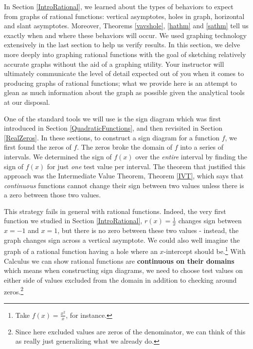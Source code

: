 \documentclass{ximera}
\begin{document}
	\author{Stitz-Zeager}



\setcounter{footnote}{0}

\label{RationalGraphs}

In Section \ref{IntroRational}, we learned about the types of behaviors to expect from graphs of rational functions: vertical asymptotes, holes in graph, horizontal and slant asymptotes.   Moreover,  Theorems \ref{vavshole}, \ref{hathm} and \ref{sathm} tell us exactly when and where these behaviors will occur.  We used graphing technology extensively in the last section to help us verify results. In this section, we delve more deeply into graphing rational functions with the goal of sketching relatively accurate graphs without the aid of a graphing utility.  Your instructor will ultimately communicate the level of detail expected out of you when it comes to producing graphs of rational functions;  what we provide here is an attempt to glean as much information about the graph as possible given the analytical tools at our disposal.  

  \smallskip

One of the standard tools we will use is the sign diagram which was first introduced in Section \ref{QuadraticFunctions}, and then revisited in Section \ref{RealZeros}. In these sections,  to construct a sign diagram for a function $f$, we first found the zeros of $f$.  The zeros broke  the domain of $f$ into a series of intervals.  We determined the sign of $f(x)$ over the \textit{entire} interval by finding the sign of $f(x)$ for just \textit{one} test value per interval.  The theorem that justified this approach was the Intermediate Value Theorem, Theorem \ref{IVT}, which says that \textit{continuous} functions cannot change their sign between two values unless there is a zero  between those two values. 

This strategy fails in  general with rational functions.  Indeed, the very first  function we studied in Section \ref{IntroRational}, $r(x) = \frac{1}{x}$ changes sign between $x=-1$ and $x=1$, but there is no zero between these two values - instead, the graph changes sign across a vertical asymptote.  We could also well imagine the graph of a rational function having a hole where an $x$-intercept should be.\footnote{Take $f(x) = \frac{x^2}{x}$, for instance.}  With Calculus we can show rational functions are \textbf{continuous on their domains} which means when constructing sign diagrams, we need to choose test values on either side of values excluded from the domain in addition to checking around zeros.\footnote{Since here excluded values are zeros of the denominator, we can think of this as really just generalizing what we already do.}
\end{document}
